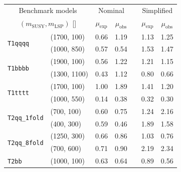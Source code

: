 \begin{table}[!t]
  \label{tab:aggr_limits}
  \centering
  \begin{tabular}{ llccccc }
    \hline
    \multicolumn{2}{c}{Benchmark models}    & \multicolumn{2}{c}{Nominal}
                                            & 
                                            & \multicolumn{2}{c}{Simplified}             \\ [0.3ex]
    \cline{3-4}
    \cline{6-7}
    \multicolumn{2}{c}{$(m_{\text{SUSY}}, m_{\mathrm{LSP}})$ [\GeVns{}]} 
                                            & $\mu_{\text{exp}}$
                                            & $\mu_{\text{obs}}$
                                            & 
                                            & $\mu_{\text{exp}}$
                                            & $\mu_{\text{obs}}$                         \\ [0.3ex]
    \hline
    \multirow{2}{*}{\texttt{T1qqqq}}        & (1700, 100)   & 0.66 & 1.19 &  & 1.13 & 1.25 \\
                                            & (1000, 850)   & 0.57 & 0.54 &  & 1.53 & 1.47 \\ [0.5ex]
    \multirow{2}{*}{\texttt{T1bbbb}}        & (1900, 100)   & 0.56 & 1.22 &  & 1.21 & 1.15 \\
                                            & (1300, 1100)  & 0.43 & 1.12 &  & 0.80 & 0.66 \\ [0.5ex]
    \multirow{2}{*}{\texttt{T1tttt}}        & (1700, 100)   & 1.00 & 1.89 &  & 1.41 & 1.20 \\
                                            & (1000, 550)   & 0.14 & 0.38 &  & 0.32 & 0.30 \\ [0.5ex]
    \multirow{2}{*}{\texttt{T2qq\_1fold}}   & (700, 100)    & 0.60 & 0.75 &  & 1.24 & 2.16 \\
                                            & (400, 300)    & 0.59 & 0.46 &  & 1.89 & 1.58 \\ [0.5ex]
    \multirow{2}{*}{\texttt{T2qq\_8fold}}   & (1250, 300)   & 0.66 & 0.86 &  & 1.03 & 0.76 \\
                                            & (700, 600)    & 0.71 & 0.90 &  & 2.19 & 2.34 \\ [0.5ex]
    \multirow{2}{*}{\texttt{T2bb}}          & (1000, 100)   & 0.63 & 0.64 &  & 0.89 & 0.56 \\

\end{tabular}
\end{table}
